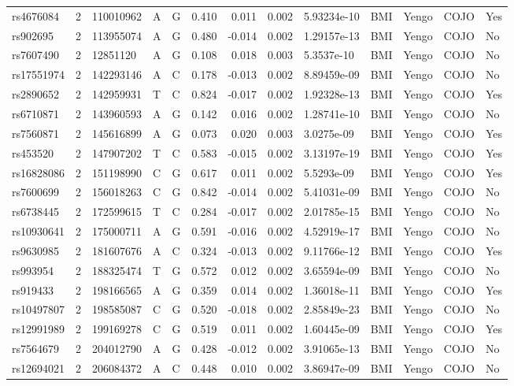 \documentclass[11pt,twoside]{bristolthesis}
\begin{document}
\begin{longtable}[t]{lrlllrrrlllll}
rs4676084 & 2 & 110010962 & A & G & 0.410 & 0.011 & 0.002 & 5.93234e-10 & BMI & Yengo & COJO & Yes\\
rs902695 & 2 & 113955074 & A & G & 0.480 & -0.014 & 0.002 & 1.29157e-13 & BMI & Yengo & COJO & No\\
\addlinespace
rs7607490 & 2 & 12851120 & A & G & 0.108 & 0.018 & 0.003 & 5.3537e-10 & BMI & Yengo & COJO & No\\
rs17551974 & 2 & 142293146 & A & C & 0.178 & -0.013 & 0.002 & 8.89459e-09 & BMI & Yengo & COJO & No\\
rs2890652 & 2 & 142959931 & T & C & 0.824 & -0.017 & 0.002 & 1.92328e-13 & BMI & Yengo & COJO & Yes\\
rs6710871 & 2 & 143960593 & A & G & 0.142 & 0.016 & 0.002 & 1.28741e-10 & BMI & Yengo & COJO & No\\
rs7560871 & 2 & 145616899 & A & G & 0.073 & 0.020 & 0.003 & 3.0275e-09 & BMI & Yengo & COJO & Yes\\
\addlinespace
rs453520 & 2 & 147907202 & T & C & 0.583 & -0.015 & 0.002 & 3.13197e-19 & BMI & Yengo & COJO & Yes\\
rs16828086 & 2 & 151198990 & C & G & 0.617 & 0.011 & 0.002 & 5.5293e-09 & BMI & Yengo & COJO & Yes\\
rs7600699 & 2 & 156018263 & C & G & 0.842 & -0.014 & 0.002 & 5.41031e-09 & BMI & Yengo & COJO & No\\
rs6738445 & 2 & 172599615 & T & C & 0.284 & -0.017 & 0.002 & 2.01785e-15 & BMI & Yengo & COJO & No\\
rs10930641 & 2 & 175000711 & A & G & 0.591 & -0.016 & 0.002 & 4.52919e-17 & BMI & Yengo & COJO & No\\
\addlinespace
rs9630985 & 2 & 181607676 & A & C & 0.324 & -0.013 & 0.002 & 9.11766e-12 & BMI & Yengo & COJO & Yes\\
rs993954 & 2 & 188325474 & T & G & 0.572 & 0.012 & 0.002 & 3.65594e-09 & BMI & Yengo & COJO & No\\
rs919433 & 2 & 198166565 & A & G & 0.359 & 0.014 & 0.002 & 1.36018e-11 & BMI & Yengo & COJO & Yes\\
rs10497807 & 2 & 198585087 & C & G & 0.520 & -0.018 & 0.002 & 2.85849e-23 & BMI & Yengo & COJO & No\\
rs12991989 & 2 & 199169278 & C & G & 0.519 & 0.011 & 0.002 & 1.60445e-09 & BMI & Yengo & COJO & Yes\\
\addlinespace
rs7564679 & 2 & 204012790 & A & G & 0.428 & -0.012 & 0.002 & 3.91065e-13 & BMI & Yengo & COJO & No\\
rs12694021 & 2 & 206084372 & A & C & 0.448 & 0.010 & 0.002 & 3.86947e-09 & BMI & Yengo & COJO & No\\

\end{longtable}
\end{document}
